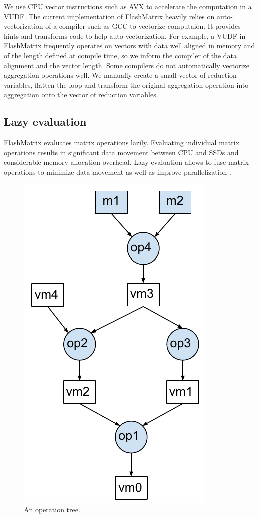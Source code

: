 We use CPU vector instructions such as AVX \cite{avx} to accelerate
the computation in a VUDF. The current implementation of FlashMatrix heavily
relies on auto-vectorization
of a compiler such as GCC to vectorize computaion. It provides hints and
transforms code to help auto-vectorization. For example, a VUDF in FlashMatrix
frequently operates on vectors with data well aligned in memory and of
the length defined at compile time, so we inform the compiler of the data alignment
and the vector length. Some compilers do not automatically vectorize
aggregation operations well. We manually create a small vector of reduction
variables, flatten the loop and transform the original aggregation operation
into aggregation onto the vector of reduction variables.

\subsection{Lazy evaluation} \label{sec:lazy_eval}
FlashMatrix evaluates matrix operations lazily. Evaluating individual
matrix operations results in significant data movement between CPU and SSDs
and considerable memory allocation overhead. Lazy evaluation allows
to fuse matrix operations to minimize data movement as well as improve
parallelization \cite{Ching12}.

\begin{figure}
	\centering
	\includegraphics[scale=0.5]{./DAG.pdf}
	\caption{An operation tree.}
	\label{fig:DAG}
\end{figure}

